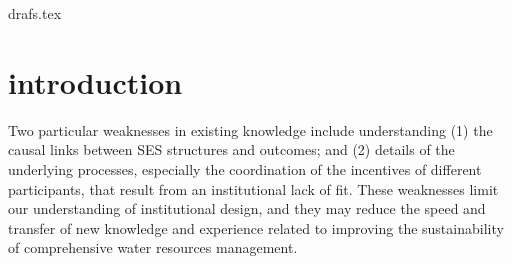 drafs.tex

\section{introduction}
Two particular weaknesses in existing knowledge include understanding (1) the causal links between SES structures and outcomes; and (2) details of the underlying processes, especially the coordination of the incentives of different participants, that result from an institutional lack of fit. These weaknesses limit our understanding of institutional design, and they may reduce the speed and transfer of new knowledge and experience related to improving the sustainability of comprehensive water resources management.





